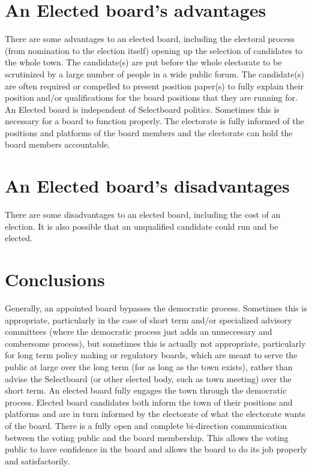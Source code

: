\documentclass[12pt]{article}
\begin{document}
\section{An Elected board's advantages}

There are some advantages to an elected board, including the electoral
process (from nomination to the election itself) opening up the selection of
candidates to the whole town. The candidate(s) are put before the whole
electorate to be scrutinized by a large number of people in a wide public
forum. The candidate(s) are often required or compelled to present position
paper(s) to fully explain their position and/or qualifications for the board
positions that they are running for. An Elected board is independent of
Selectboard politics. Sometimes this is necessary for a board to function
properly. The electorate is fully informed of the positions and platforms of
the board members and the electorate can hold the board members accountable.

\section{An Elected board's disadvantages}

There are some disadvantages to an  elected board, including the cost of an 
election. It is also possible that an unqualified candidate could run and be 
elected. 

\section{Conclusions}

Generally, an appointed board bypasses the democratic process. Sometimes this
is appropriate, particularly in the case of short term and/or specialized
advisory committees (where the democratic process just adds an unneccesary and
combersome process), but sometimes this is actually not appropriate,
particularly for long term policy making or regulatory boards, which are meant
to serve the public at large over the long term (for as long as the town
exists), rather than advise the Selectboard (or other elected body, such as
town meeting) over the short term. An elected board fully engages the town
through the democratic process. Elected board candidates both inform the town
of their positions and platforms and are in turn informed by the electorate of
what the electorate wants of the board. There is a fully open and complete
bi-direction communication between the voting public and the board membership.
This allows the voting public to have confidence in the board and allows the
board to do its job properly and satisfactorily.

\clearpage
{}


\end{document}
